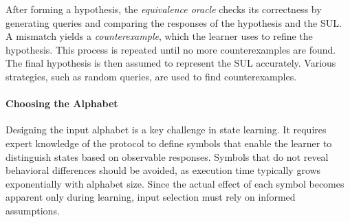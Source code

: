 After forming a hypothesis, the \textit{equivalence oracle} checks its correctness by generating queries and comparing the responses of the hypothesis and the SUL. A mismatch yields a \textit{counterexample}, which the learner uses to refine the hypothesis. This process is repeated until no more counterexamples are found. The final hypothesis is then assumed to represent the SUL accurately. Various strategies, such as random queries, are used to find counterexamples.

\paragraph{Choosing the Alphabet}

Designing the input alphabet is a key challenge in state learning. It requires expert knowledge of the protocol to define symbols that enable the learner to distinguish states based on observable responses. Symbols that do not reveal behavioral differences should be avoided, as execution time typically grows exponentially with alphabet size. Since the actual effect of each symbol becomes apparent only during learning, input selection must rely on informed assumptions.
